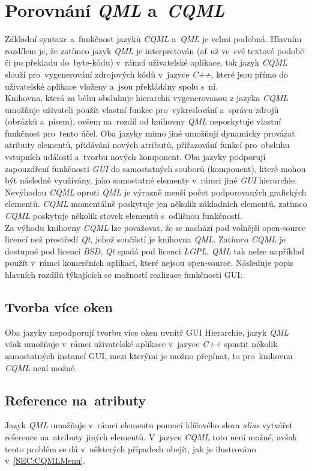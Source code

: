\documentclass[11pt,twoside,a4paper]{book}
\begin{document}
\section{Porovnání \textit{QML} a~\textit{CQML}}
Základní syntaxe a~funkčnost jazyků \textit{CQML} a~\textit{QML} je velmi podobná. Hlavním rozdílem je, že zatímco jazyk \textit{QML} je interpretován (ať už ve~své textové podobě či po překladu do~byte-kódu) v~rámci uživatelské aplikace, tak jazyk \textit{CQML} slouží pro~vygenerování zdrojových kódů v~jazyce \textit{C++}, které jsou přímo do uživatelské aplikace vloženy a~jsou překládány spolu s~ní.\\
Knihovna, která za běhu obsluhuje hierarchii vygenerovanou z jazyka \textit{CQML} umožňuje uživateli použít vlastní funkce pro~vykreslování a~správu zdrojů (obrázků a~písem), ovšem na~rozdíl od knihovny \textit{QML} neposkytuje vlastní funkčnost pro~tento účel.
Oba jazyky mimo jiné umožňují dynamicky provázat atributy elementů, přidávání nových atributů, přiřazování funkcí pro~obsluhu vstupních událostí a~tvorbu nových komponent. Oba jazyky podporují zapouzdření funkčnosti \textit{GUI} do samostatných souborů (komponent), které mohou být následně využívány, jako samostatné elementy v~rámci jiné \textit{GUI} hierarchie.\\
Nevýhodou \textit{CQML} oproti \textit{QML} je výrazně menší počet podporovaných grafických elementů. \textit{CQML} momentálně poskytuje jen několik základních elementů, zatímco \textit{CQML} poskytuje několik stovek elementů s~odlišnou funkčností.\\
Za výhodu knihovny \textit{CQML} lze považovat, že se nachází pod volnější open-source licencí než prostředí \textit{Qt}, jehož součástí je knihovna \textit{QML}. Zatímco \textit{CQML} je dostupné pod licencí \textit{BSD}, \textit{Qt} spadá pod licenci \textit{LGPL}. \textit{QML} tak nelze například použít v~rámci komerčních aplikací, které nejsou open-source.
Následuje popis hlavních rozdílů týkajících se možností realizace funkčnosti GUI.
\subsection{Tvorba více oken}
Oba jazyky nepodporují tvorbu více oken uvnitř GUI Hierarchie, jazyk \textit{QML} však umožňuje v~rámci uživatelské aplikace v~jazyce \textit{C++} spustit několik samostatných instancí GUI, mezi kterými je možno přepínat, to pro~knihovnu \textit{CQML} není možné.
\subsection{Reference na~atributy}
Jazyk \textit{QML} umožňuje v~rámci elementu pomocí klíčového slova \textit{alias} vytvářet reference na~atributy jiných elementů. V~jazyce \textit{CQML} toto není možné, avšak tento problém se dá v~některých případech obejít, jak je ilustrováno v~\ref{SEC:CQMLMenu}.
\end{document}
